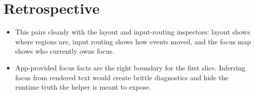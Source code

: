 \section{Retrospective}\label{record-257-retrospective}

\begin{itemize}
\tightlist
\item
  This pairs cleanly with the layout and input-routing inspectors: layout shows where regions are, input routing shows how events moved, and the focus map shows who currently owns focus.
\item
  App-provided focus facts are the right boundary for the first slice. Inferring focus from rendered text would create brittle diagnostics and hide the runtime truth the helper is meant to expose.
\end{itemize}

